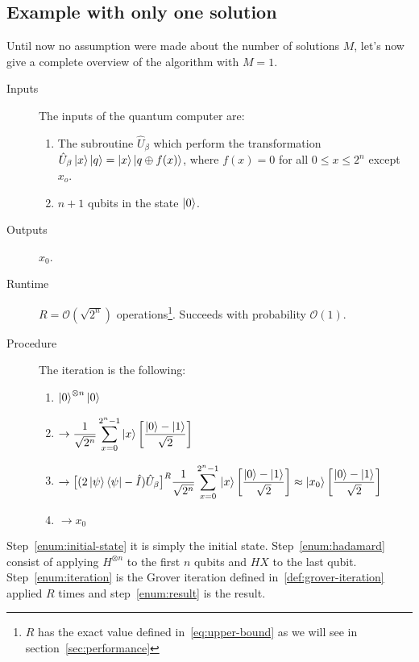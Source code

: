 \subsection{Example with only one solution}
Until now no assumption were made about the number of solutions $M$, let's now give a complete overview of the algorithm with $M=1$.
\begin{description}
   \item[Inputs] The inputs of the quantum computer are:
    \begin{enumerate}
  \item The subroutine $\hat{U}_\beta$ which perform the transformation $\hat{U}_\beta\ket{x}\ket{q} = \ket{x}\ket{q \oplus f(x)}$, where $f(x) = 0$ for all $0 \leq x \leq 2^n$ except $x_o$.
  \item $n+1$ qubits in the state $\ket{0}$.
\end{enumerate}
   \item[Outputs] $x_0$.
   \item[Runtime] $R = \mathcal{O}(\sqrt{2^n})$ operations\footnote{$R$ has the exact value defined in~\ref{eq:upper-bound} as we will see in section~\ref{sec:performance}}. Succeeds with probability $\mathcal{O}(1)$.
   \item[Procedure] The iteration is the following:
   \begin{enumerate}
  \item $\ket{0}^{\otimes n} \ket{0}$ \label{enum:initial-state}
  \item $\begin{aligned} \rightarrow \frac{1}{\sqrt{2^n}} \sum_{x=0}^{2^n-1}\ket{x} \biggl[\frac{\ket{0}-\ket{1}}{\sqrt{2}}\biggr] \end{aligned}$ \label{enum:hadamard}
  \item $\begin{aligned} \rightarrow \bigl[(2 \ket{\psi}\bra{\psi} - \hat{I})\hat{U}_\beta\bigr]^R \frac{1}{\sqrt{2^n}} \sum_{x=0}^{2^n-1}\ket{x} \biggl[\frac{\ket{0}-\ket{1}}{\sqrt{2}}\biggr] \approx \ket{x_0} \biggl[\frac{\ket{0}-\ket{1}}{\sqrt{2}}\biggr] \end{aligned}$ \label{enum:iteration}
  \item $\rightarrow x_0$ \label{enum:result}
\end{enumerate}
\end{description}

Step~\ref{enum:initial-state} it is simply the initial state. Step~\ref{enum:hadamard} consist of applying $H^{\otimes n}$ to the first $n$ qubits and $H X$ to the last qubit. Step~\ref{enum:iteration} is the Grover iteration defined in~\ref{def:grover-iteration} applied $R$ times and step~\ref{enum:result} is the result.


